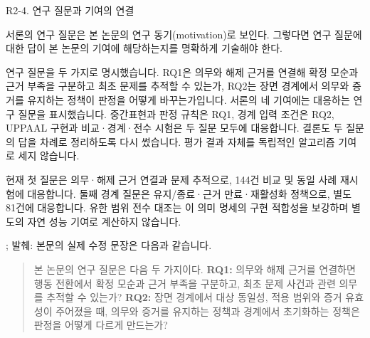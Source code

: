 \begin{reviewitem}{R2-4. 연구 질문과 기여의 연결}

\begin{reviewercomment}

서론의 연구 질문은 본 논문의 연구 동기(motivation)로 보인다. 그렇다면 연구 질문에 대한 답이 본 논문의 기여에 해당하는지를 명확하게 기술해야 한다.

\end{reviewercomment}

\begin{authorresponse}

연구 질문을 두 가지로 명시했습니다. RQ1은 의무와 해제 근거를 연결해 확정 모순과 근거 부족을 구분하고 최초 문제를 추적할 수 있는가, RQ2는 장면 경계에서 의무와 증거를 유지하는 정책이 판정을 어떻게 바꾸는가입니다. 서론의 네 기여에는 대응하는 연구 질문을 표시했습니다. 중간표현과 판정 규칙은 RQ1, 경계 입력 조건은 RQ2, UPPAAL 구현과 비교·경계·전수 시험은 두 질문 모두에 대응합니다. 결론도 두 질문의 답을 차례로 정리하도록 다시 썼습니다. 평가 결과 자체를 독립적인 알고리즘 기여로 세지 않습니다.

현재 첫 질문은 의무·해제 근거 연결과 문제 추적으로, 144건 비교 및 동일 사례 재시험에 대응합니다. 둘째 경계 질문은 유지/종료·근거 만료·재활성화 정책으로, 별도 81건에 대응합니다. 유한 범위 전수 대조는 이 의미 명세의 구현 적합성을 보강하며 별도의 자연 성능 기여로 계산하지 않습니다.

\end{authorresponse}

\begin{manuscriptrevision}{; 발췌: }
본문의 실제 수정 문장은 다음과 같습니다.

\begin{quote}
본 논문의 연구 질문은 다음 두 가지이다. \textbf{RQ1:} 의무와 해제 근거를 연결하면 행동 전환에서 확정 모순과 근거 부족을 구분하고, 최초 문제 사건과 관련 의무를 추적할 수 있는가? \textbf{RQ2:} 장면 경계에서 대상 동일성, 적용 범위와 증거 유효성이 주어졌을 때, 의무와 증거를 유지하는 정책과 경계에서 초기화하는 정책은 판정을 어떻게 다르게 만드는가?
\end{quote}
\end{manuscriptrevision}

\end{reviewitem}

\clearpage

